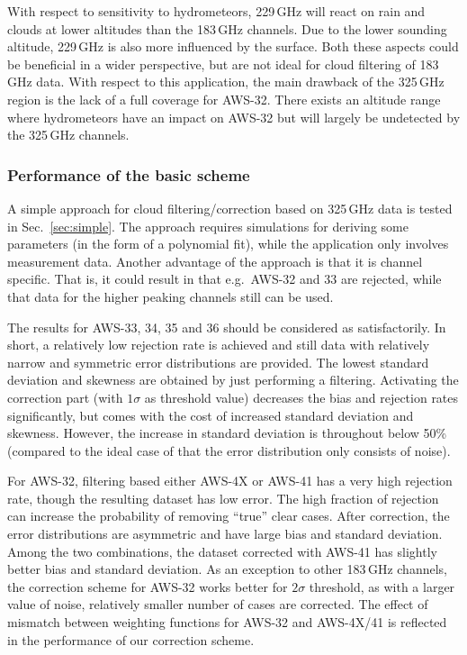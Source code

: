 \documentclass[12pt]{article}
\begin{document}
With respect to sensitivity to hydrometeors, 229\,GHz will react on rain and
clouds at lower altitudes than the 183\,GHz channels. Due to the lower sounding
altitude, 229\,GHz is also more influenced by the surface. Both these aspects
could be beneficial in a wider perspective, but are not ideal for cloud
filtering of 183\,GHz data. With respect to this application, the main drawback
of the 325\,GHz region is the lack of a full coverage for AWS-32. There exists
an altitude range where hydrometeors have an impact on AWS-32 but will largely
be undetected by the 325\,GHz channels.


\subsubsection{Performance of the basic scheme}
%
A simple approach for cloud filtering/correction based on 325\,GHz data is
tested in Sec.~\ref{sec:simple}. The approach requires simulations for deriving
some parameters (in the form of a polynomial fit), while the application only
involves measurement data. Another advantage of the approach is that it is
channel specific. That is, it could result in that e.g.\ AWS-32 and 33 are
rejected, while that data for the higher peaking channels still can be used.

The results for AWS-33, 34, 35 and 36 should be considered as satisfactorily.
In short, a relatively low rejection rate is achieved and still data with
relatively narrow and symmetric error distributions are provided. The lowest
standard deviation and skewness are obtained by just performing a filtering.
Activating the correction part (with $1\sigma$ as threshold value) decreases
the bias and rejection rates significantly, but comes with the cost of
increased standard deviation and skewness. However, the increase in standard
deviation is throughout below 50\% (compared to the ideal case of that the
error distribution only consists of noise). 

For AWS-32, filtering based either AWS-4X or AWS-41 has a very high rejection
rate, though the resulting dataset has low error. The high fraction of
rejection can increase the probability of removing ``true'' clear cases. After
correction, the error distributions are asymmetric and have large bias and
standard deviation. Among the two combinations, the dataset corrected with
AWS-41 has slightly better bias and standard deviation. As an exception to
other 183\,GHz channels, the correction scheme for AWS-32 works better for
$2\sigma$ threshold, as with a larger value of noise, relatively smaller number
of cases are corrected. The effect of mismatch between weighting functions for
AWS-32 and AWS-4X/41 is reflected in the performance of our correction scheme.
\end{document}
